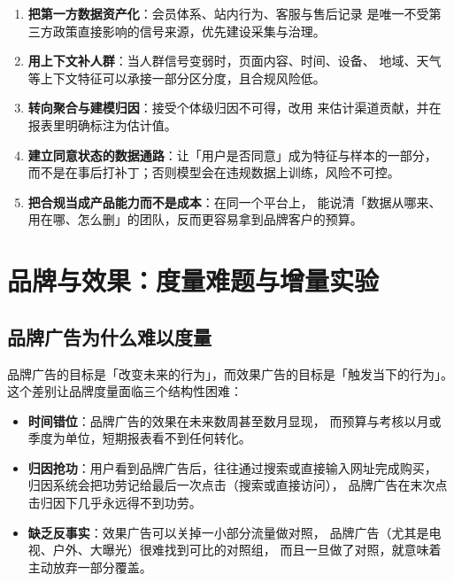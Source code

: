 \begin{toolbox}[隐私约束下的定向能力自救清单]
\begin{enumerate}
  \item \textbf{把第一方数据资产化}：会员体系、站内行为、客服与售后记录
        是唯一不受第三方政策直接影响的信号来源，优先建设采集与治理。
  \item \textbf{用上下文补人群}：当人群信号变弱时，页面内容、时间、设备、
        地域、天气等上下文特征可以承接一部分区分度，且合规风险低。
  \item \textbf{转向聚合与建模归因}：接受个体级归因不可得，改用
        来估计渠道贡献，并在报表里明确标注为估计值。
  \item \textbf{建立同意状态的数据通路}：让「用户是否同意」成为特征与样本的一部分，
        而不是在事后打补丁；否则模型会在违规数据上训练，风险不可控。
  \item \textbf{把合规当成产品能力而不是成本}：在同一个平台上，
        能说清「数据从哪来、用在哪、怎么删」的团队，反而更容易拿到品牌客户的预算。
\end{enumerate}
\end{toolbox}

\section{品牌与效果：度量难题与增量实验}

\subsection{品牌广告为什么难以度量}

品牌广告的目标是「改变未来的行为」，而效果广告的目标是「触发当下的行为」。
这个差别让品牌度量面临三个结构性困难：

\begin{itemize}
  \item \textbf{时间错位}：品牌广告的效果在未来数周甚至数月显现，
        而预算与考核以月或季度为单位，短期报表看不到任何转化。
  \item \textbf{归因抢功}：用户看到品牌广告后，往往通过搜索或直接输入网址完成购买，
        归因系统会把功劳记给最后一次点击（搜索或直接访问），
        品牌广告在末次点击归因下几乎永远得不到功劳。
  \item \textbf{缺乏反事实}：效果广告可以关掉一小部分流量做对照，
        品牌广告（尤其是电视、户外、大曝光）很难找到可比的对照组，
        而且一旦做了对照，就意味着主动放弃一部分覆盖。
\end{itemize}

